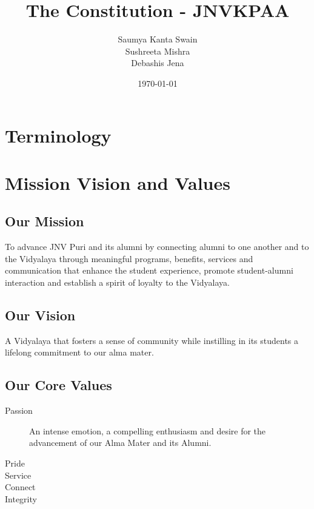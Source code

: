 \documentclass[a4paper,11pt]{book}
\title{The Constitution - JNVKPAA}
\author{Saumya Kanta Swain \\
Sushreeta Mishra \\
Debashis Jena}
\date{\today}
\begin{document}
\maketitle
\tableofcontents

\chapter*{Terminology}


\chapter{Mission Vision and Values}

\section{Our Mission}
To advance JNV Puri and its alumni by connecting alumni to one another 
and to the Vidyalaya through meaningful programs, benefits, services and 
communication that enhance the student experience, promote student-alumni 
interaction and establish a spirit of loyalty to the Vidyalaya.

\section{Our Vision}
A Vidyalaya that fosters a sense of community while instilling in its students 
a lifelong commitment to our alma mater.

\section{Our Core Values}
\begin{description}
\item [Passion] An intense emotion, a compelling enthusiasm and desire for the 
advancement of our Alma Mater and its Alumni.
\item [Pride] 
\item [Service]
\item [Connect]
\item [Integrity]
\end{description}
\end{document}
